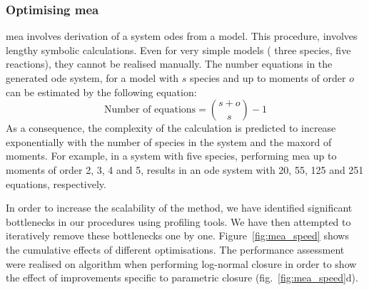 \subsubsection{Optimising \acrlong{mea}}
\label{sec:optimising_mea}

\gls{mea} involves derivation of a system \gls{ode}s from a model.
This procedure\cite{ale_general_2013}, involves lengthy symbolic calculations.
Even for very simple models (\eg{} three species, five reactions), they cannot be realised manually.
The number equations in the generated \gls{ode} system, for a model with $s$ species and up to moments of order $o$ can be estimated by the following equation: 
\begin{equation}
    \text{Number of equations} = {{s + o} \choose {s}} - 1
    \label{eq:number_of_equations}
\end{equation}
As a consequence, the complexity of the calculation is predicted to increase exponentially with the number of species in the system and the \gls{maxord} of moments. 
For example, in a system with five species, performing \gls{mea} up to moments of order 2, 3, 4 and 5, results in an \gls{ode} system with 20, 55, 125 and 251 equations, respectively. 


In order to increase the scalability of the method, we have identified significant bottlenecks in our procedures using \py{} profiling tools.
We have then attempted to iteratively remove these bottlenecks one by one. Figure~\ref{fig:mea_speed} shows the cumulative effects of different optimisations.
The performance assessment were realised on algorithm when performing log-normal closure in order to show the effect of improvements specific to parametric closure (fig.~\ref{fig:mea_speed}d). 

